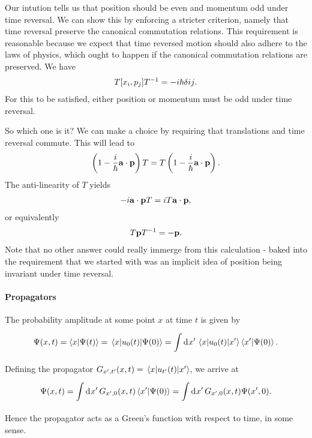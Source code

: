 Our intution tells us that position should be even and momentum odd under time reversal. We can show this by enforcing a stricter criterion, namely that time reversal preserve the canonical commutation relations. This requirement is reasonable because we expect that time reversed motion should also adhere to the laws of physics, which ought to happen if the canonical commutation relations are preserved. We have
\begin{align*}
	T\comm{x_{i}}{p_{j}}T^{-1} = -i\hbar\delta{ij}.
\end{align*}
For this to be satisfied, either position or momentum must be odd under time reversal.

So which one is it? We can make a choice by requiring that translations and time reversal commute. This will lead to
\begin{align*}
	\left(1 - \frac{i}{\hbar}\vb{a}\cdot\vb{p}\right)T = T\left(1 - \frac{i}{\hbar}\vb{a}\cdot\vb{p}\right).
\end{align*}
The anti-linearity of $T$ yields
\begin{align*}
	-i\vb{a}\cdot\vb{p}T = iT\vb{a}\cdot\vb{p},
\end{align*}
or equivalently
\begin{align*}
	T\vb{p}T^{-1} = -\vb{p}.
\end{align*}
Note that no other answer could really immerge from this calculation - baked into the requirement that we started with was an implicit idea of position being invariant under time reversal.

\paragraph{Propagators}
The probability amplitude at some point $x$ at time $t$ is given by
\begin{align*}
	\Psi(x, t) = \braket{x}{\Psi(t)} = \mel{x}{u_{0}(t)}{\Psi(0)} = \int\limits_{}^{}\dd[]{x^{\prime}}\mel{x}{u_{0}(t)}{x^{\prime}}\braket{x^{\prime}}{\Psi(0)}.
\end{align*}
Defining the propagator $G_{x^{\prime}, t^{\prime}}(x, t) = \mel{x}{u_{t^{\prime}}(t)}{x^{\prime}}$, we arrive at
\begin{align*}
	\Psi(x, t) = \int\limits_{}^{}\dd[]{x^{\prime}}G_{x^{\prime}, 0}(x, t)\braket{x^{\prime}}{\Psi(0)} = \int\limits_{}^{}\dd[]{x^{\prime}}G_{x^{\prime}, 0}(x, t)\Psi(x^{\prime}, 0).
\end{align*}
Hence the propagator acts as a Green's function with respect to time, in some sense.

